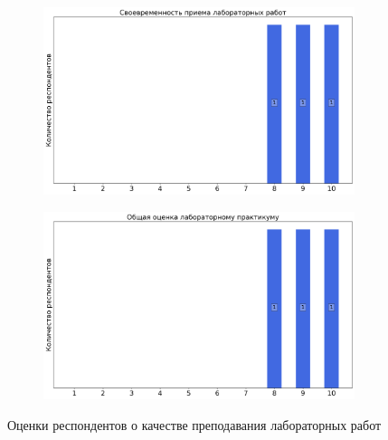 \begin{figure}[H]
\begin{subfigure}[b]{0.45\textwidth}
                \end{subfigure}
                \begin{subfigure}[b]{0.45\textwidth}
                    \centering
                    \includegraphics[width=\textwidth]{images/3 course/Общая физика - квантовая физика/labniks-marks-Хан Ф.В.-2.png}
                \end{subfigure}
                \begin{subfigure}[b]{0.45\textwidth}
                    \centering
                    \includegraphics[width=\textwidth]{images/3 course/Общая физика - квантовая физика/labniks-marks-Хан Ф.В.-3.png}
                \end{subfigure}	
                \caption{Оценки респондентов о качестве преподавания лабораторных работ}
            \end{figure}

